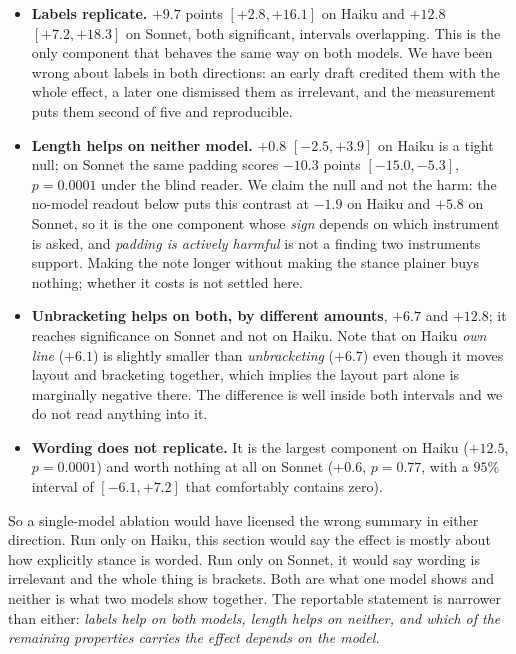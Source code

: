 \documentclass[11pt]{article}
\begin{document}
\begin{itemize}\itemsep2pt
\item \textbf{Labels replicate.} $+9.7$ points $[+2.8, +16.1]$ on Haiku and $+12.8$
      $[+7.2, +18.3]$ on Sonnet, both significant, intervals overlapping. This is the
      only component that behaves the same way on both models. We have been wrong about
      labels in both directions: an early draft credited them with the whole effect, a
      later one dismissed them as irrelevant, and the measurement puts them second of
      five and reproducible.
\item \textbf{Length helps on neither model.} $+0.8$ $[-2.5, +3.9]$ on Haiku is a
      tight null; on Sonnet the same padding scores $-10.3$ points
      $[-15.0, -5.3]$, $p=0.0001$ under the blind reader. We claim the null and not the
      harm: the no-model readout below puts this contrast at $-1.9$ on Haiku and
      $+5.8$ on Sonnet, so it is the one component whose \emph{sign} depends on which
      instrument is asked, and \emph{padding is actively harmful} is not a finding two
      instruments support. Making the note longer without making the stance plainer buys
      nothing; whether it costs is not settled here.
\item \textbf{Unbracketing helps on both, by different amounts}, $+6.7$ and $+12.8$; it
      reaches significance on Sonnet and not on Haiku. Note that on Haiku \emph{own line}
      ($+6.1$) is slightly smaller than \emph{unbracketing} ($+6.7$) even though it moves
      layout and bracketing together, which implies the layout part alone is marginally
      negative there. The difference is well inside both intervals and we do not read
      anything into it.
\item \textbf{Wording does not replicate.} It is the largest component on Haiku
      ($+12.5$, $p=0.0001$) and worth nothing at all on Sonnet ($+0.6$, $p=0.77$, with a
      $95\%$ interval of $[-6.1, +7.2]$ that comfortably contains zero).
\end{itemize}

\noindent So a single-model ablation would have licensed the wrong summary in either
direction. Run only on Haiku, this section would say the effect is mostly about how
explicitly stance is worded. Run only on Sonnet, it would say wording is irrelevant and
the whole thing is brackets. Both are what one model shows and neither is what two models
show together. The reportable statement is narrower than either: \emph{labels help on both
models, length helps on neither, and which of the remaining properties carries the effect
depends on the model.}
\end{document}
